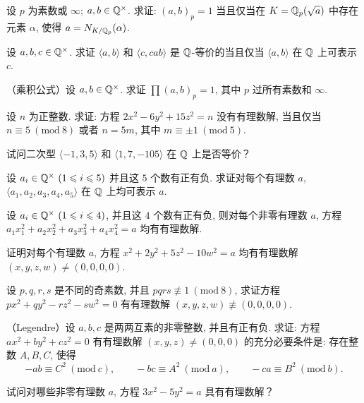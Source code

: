 \begin{Exercises}
\item 设 $p$ 为素数或 $\infty$; $a,b\in\mathbb{Q}^{\times}$. 求证: $(a,b)_p=1$ 当且仅当在 $K=\mathbb{Q}_p(\sqrt{a})$ 中存在元素 $\alpha$, 使得 $a=N_{K/\mathbb{Q}_p}(\alpha)$.

\item 设 $a,b,c\in\mathbb{Q}^{\times}$. 求证 $\langle a,b\rangle$ 和 $\langle c,cab\rangle$ 是 $\mathbb{Q}$-等价的当且仅当 $\langle a,b\rangle$ 在 $\mathbb{Q}$ 上可表示 $c$.

\item （乘积公式）设 $a,b\in\mathbb{Q}^{\times}$. 求证 $\prod(a,b)_p=1$, 其中 $p$ 过所有素数和 $\infty$.

\item 设 $n$ 为正整数. 求证: 方程 $2x^2-6y^2+15z^2=n$ 没有有理数解, 当且仅当 $n\equiv 5\ (\mathrm{mod}\ 8)$ 或者 $n=5m$, 其中 $m\equiv\pm 1\ (\mathrm{mod}\ 5)$.

\item 试问二次型 $\langle -1,3,5\rangle$ 和 $\langle 1,7,-105\rangle$ 在 $\mathbb{Q}$ 上是否等价？

\item 设 $a_i\in\mathbb{Q}^{\times}\ (1\leqslant i\leqslant 5)$ 并且这 $5$ 个数有正有负. 求证对每个有理数 $a$, $\langle a_1,a_2,a_3,a_4,a_5\rangle$ 在 $\mathbb{Q}$ 上均可表示 $a$.

\item 设 $a_i\in\mathbb{Q}^{\times}\ (1\leqslant i\leqslant 4)$, 并且这 $4$ 个数有正有负, 则对每个非零有理数 $a$, 方程 $a_1x_1^2+a_2x_2^2+a_3x_3^2+a_4x_4^2=a$ 均有有理数解.

\item 证明对每个有理数 $a$, 方程 $x^2+2y^2+5z^2-10w^2=a$ 均有有理数解 $(x,y,z,w)\neq(0,0,0,0)$.

\item 设 $p,q,r,s$ 是不同的奇素数, 并且 $pqrs\not\equiv 1\ (\mathrm{mod}\ 8)$, 求证方程 $px^2+qy^2-rz^2-sw^2=0$ 有有理数解 $(x,y,z,w)\not\equiv(0,0,0,0)$.

\item （Legendre）设 $a,b,c$ 是两两互素的非零整数, 并且有正有负. 求证: 方程 $ax^2+by^2+cz^2=0$ 有有理数解 $(x,y,z)\neq(0,0,0)$ 的充分必要条件是: 存在整数 $A,B,C$, 使得
\[
  -ab\equiv C^2\ (\mathrm{mod}\ c),\qquad
  -bc\equiv A^2\ (\mathrm{mod}\ a),\qquad
  -ca\equiv B^2\ (\mathrm{mod}\ b).
\]

\item 试问对哪些非零有理数 $a$, 方程 $3x^2-5y^2=a$ 具有有理数解？
\end{Exercises}
